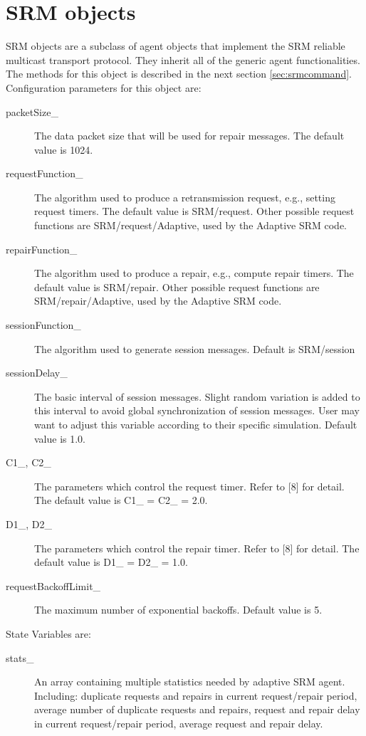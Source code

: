 \section{SRM objects}
\label{srmobjects}
SRM objects are a subclass of agent objects that implement the SRM
reliable multicast transport protocol. They inherit all of the generic
agent functionalities. The methods for this object is described in the
next section \ref{sec:srmcommand}. Configuration parameters for this object
are:
\begin{description}
\item[packetSize\_] The data packet size that will be used for repair
messages. The default value is 1024. 

\item[requestFunction\_] The algorithm used to produce a retransmission
request, e.g., setting request timers. The default value is SRM/request.
Other possible request functions are SRM/request/Adaptive, used by the
Adaptive SRM code. 

\item[repairFunction\_]
The algorithm used to produce a repair, e.g., compute repair timers. The
default value is SRM/repair. Other possible request functions are
SRM/repair/Adaptive, used by the Adaptive SRM code. 

\item[sessionFunction\_]
The algorithm used to generate session messages. Default is SRM/session 

\item[sessionDelay\_]
The basic interval of session messages. Slight random variation is added
to this interval to avoid global synchronization of session messages. User
may want to adjust this variable according to their specific simulation.
Default value is 1.0. 

\item[C1\_, C2\_]
The parameters which control the request timer. Refer to [8] for detail.
The default value is C1\_ = C2\_ = 2.0. 

\item[D1\_, D2\_]
The parameters which control the repair timer. Refer to [8] for detail.
The default value is D1\_ = D2\_ = 1.0. 

\item[requestBackoffLimit\_]
The maximum number of exponential backoffs. Default value is 5. 
\end{description}

State Variables are:
\begin{description}
\item[stats\_]
An array containing multiple statistics needed by adaptive SRM agent.
Including: duplicate requests and repairs in current request/repair
period, average number of duplicate requests and repairs, request and
repair delay in current request/repair period, average request and repair
delay. 
\end{description}

